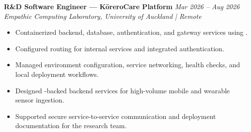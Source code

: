 \noindent
\textbf{R\&D Software Engineer — KōreroCare Platform} \hfill \textit{Mar 2026 -- Aug 2026}\\
\noindent
\textit{Empathic Computing Laboratory, University of Auckland | Remote}\\[0.05em]

\begin{itemize}[leftmargin=*, itemsep=0.3em, topsep=0.01em]
  \item Containerized backend, database, authentication, and gateway services using .
  \item Configured  routing for internal services and integrated  authentication.
  \item Managed environment configuration, service networking, health checks, and local deployment workflows.
  \item Designed -backed backend services for high-volume mobile and wearable sensor ingestion.
  \item Supported secure service-to-service communication and deployment documentation for the research team.
\end{itemize}
